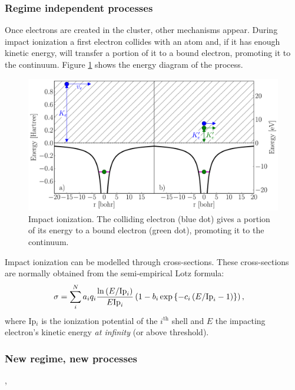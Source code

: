 \subsubsection{Regime independent processes}
\label{section:intro:mechanisms:noregime}

Once electrons are created in the cluster, other mechanisms appear. During
impact ionization a first electron collides with an atom and, if it has enough
kinetic energy, will transfer a portion of it to a bound electron, promoting it
to the continuum. Figure \ref{fig:ionization:impact} shows the energy diagram
of the process.

\begin{figure}
 \centering
 \includegraphics[width=\figurewidth]{figures/ionization_impact}
 \caption{Impact ionization. The colliding electron (blue dot) gives a portion
          of its energy to a bound electron (green dot), promoting it to the
          continuum.}
 \label{fig:ionization:impact}
\end{figure}

Impact ionization can be modelled through cross-sections. These
cross-sections are normally obtained from the semi-empirical Lotz
formula\cite{Lotz1967}:
\begin{align}
\sigma & = \sum_{i}^{N} a_i q_i \frac{\ln{\left( E/\textrm{Ip}_i \right)}}{E \textrm{Ip}_i} \left( 1 - b_i
\exp{ \left\{ -c_i \left( E/\textrm{Ip}_i - 1 \right) \right\}} \right),
\label{eqn:impact:ionization:lotz}
\end{align}
where Ip$_i$ is the ionization potential of the $i^{\textrm{th}}$ shell and $E$
the impacting electron's kinetic energy \textit{at infinity} (or above threshold).

\subsubsection{New regime, new processes}
\label{section:intro:mechanisms:new},

